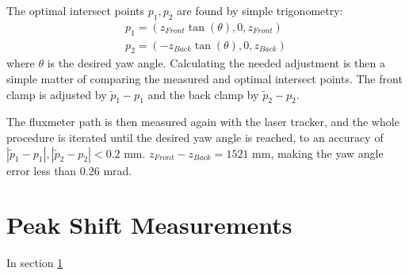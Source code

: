 The optimal intersect points $p_1, p_2$
are found by simple trigonometry:
\begin{align}
    p_1 = (z_{Front}\tan(\theta), 0, z_{Front}) \\ 
    p_2 = (-z_{Back}\tan(\theta), 0, z_{Back})
\end{align}
where $\theta$ is the desired yaw angle. Calculating the needed
adjustment is then a simple matter of comparing the measured
and optimal intersect points. The front clamp is adjusted by
$\tilde{p}_1 - p_1$ and the back clamp by $\tilde{p}_2 - p_2$.

The fluxmeter path is then measured again with the laser tracker,
and the whole procedure is iterated until the desired yaw angle
is reached, to an accuracy of 
$|\tilde{p}_1 - p_1|, |\tilde{p}_2 - p_2| < 0.2$ mm.
$z_{Front} - z_{Back} = 1521$ mm, making the yaw angle error
less than $0.26$ mrad.

\section{Peak Shift Measurements}
In section \ref{}